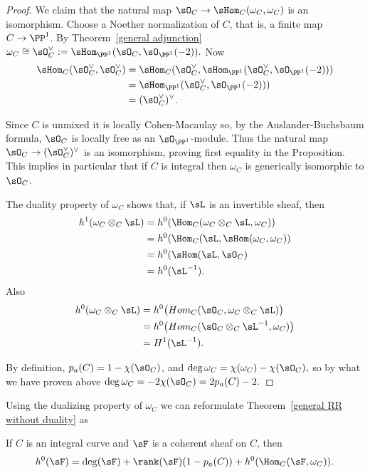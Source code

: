\begin{proof}
 We claim that the natural map $\sO_C \to \sHom_C(\omega_C, \omega_C)$ is an isomorphism. Choose a Noether
normalization of $C$, that is, a finite map $C\to \PP^1$.
By Theorem~\ref{general adjunction} $\omega_C \cong \sO_C^\vee := \sHom_{\PP^1}(\sO_C,\sO_{\PP^1}(-2)).$
Now
$$
\begin{aligned}
\sHom_{C}(\sO_C^\vee,\sO_C^\vee ) &=\sHom_{C}(\sO_C^\vee, \sHom_{\PP^1}(\sO_C^\vee,\sO_{\PP^1}(-2)))\\
&= \sHom_{\PP^1}(\sO_C^\vee, \sO_{\PP^1}(-2)))\\
&= (\sO_C^\vee)^\vee.
\end{aligned}
$$

Since $C$ is unmixed it is locally Cohen-Macaulay so, by the Auslander-Buchsbaum formula, 
$\sO_C$ is locally free as an $\sO_{\PP^1}$-module.
Thus the natural map $\sO_C \to (\sO_C^\vee)^\vee$ is an isomorphism, proving first equality in the Proposition.
This implies in particular that if $C$ is integral then $\omega_C$ is generically isomorphic to $\sO_C$.

 The duality property of $\omega_C$ shows that, if $\sL$ is an invertible sheaf, then
$$
\begin{aligned}
h^1(\omega_C \otimes_C \sL) &= h^0(\Hom_C(\omega_C\otimes_C \sL, \omega_C))\\
&= h^0(\Hom_C(\sL, \sHom(\omega_C,\omega_C))\\
&=h^0 (\sHom(\sL, \sO_C)\\
&= h^0(\sL^{-1}).
\end{aligned}
$$
Also
$$
\begin{aligned}
h^0(\omega_C\otimes_C\sL) &= h^0 \bigl(Hom_C(\sO_C, \omega_C\otimes_C\sL)\bigr)\\
&=h^0 \bigl(Hom_C(\sO_C\otimes_C\sL^{-1}, \omega_C)\bigr)\\
&=H^1 (\sL^{-1}). 
\end{aligned}
$$

 By definition, $p_a(C) = 1-\chi(\sO_C)$, and 
 $\deg \omega_C = \chi(\omega_C) - \chi(\sO_C),$
 so by what we have proven above
 $\deg \omega_C = -2\chi(\sO_C) = 2p_a(C)-2.$
 \end{proof}

Using the dualizing property of $\omega_C$ we can reformulate Theorem~\ref{general RR without duality} as
\begin{theorem}\label{general RR with duality}
If $C$ is an integral curve and $\sF$ is a coherent sheaf on $C$, then
$$
h^0(\sF) = \deg(\sF) + \rank(\sF)(1-p_a(C)) + h^0(\Hom_C(\sF, \omega_C)).
$$
\end{theorem}

